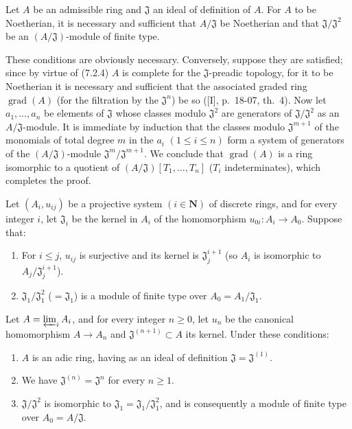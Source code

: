 \begin{corollary}[7.2.6]
\label{0.7.2.6}
Let $A$ be an admissible ring and $\mathfrak J$ an ideal of definition of $A$.
For $A$ to be Noetherian, it is necessary and sufficient that $A/\mathfrak J$ be
Noetherian and that $\mathfrak J/\mathfrak J^2$ be an
$(A/\mathfrak J)$-module of finite type.
\end{corollary}

These conditions are obviously necessary. Conversely, suppose they are
satisfied; since by virtue of (7.2.4) $A$ is complete for the
$\mathfrak J$-preadic topology, for it to be Noetherian it is necessary and sufficient that
the associated graded ring $\operatorname{grad}(A)$ (for the filtration by the
$\mathfrak J^n$) be so ([I], p.~18-07, th.~4). Now let
$a_1,\ldots,a_n$ be elements of $\mathfrak J$ whose classes modulo
$\mathfrak J^2$ are generators of $\mathfrak J/\mathfrak J^2$ as an
$A/\mathfrak J$-module. It is immediate by induction that the classes modulo
$\mathfrak J^{m+1}$ of the monomials of total degree $m$ in the $a_i$
$(1\leq i\leq n)$ form a system of generators of the
$(A/\mathfrak J)$-module $\mathfrak J^m/\mathfrak J^{m+1}$. We conclude that
$\operatorname{grad}(A)$ is a ring isomorphic to a quotient of
$(A/\mathfrak J)[T_1,\ldots,T_n]$ ($T_i$ indeterminates), which completes the
proof.

\begin{proposition}[7.2.7]
\label{0.7.2.7}
Let $(A_i,u_{ij})$ be a projective system $(i\in\mathbf N)$ of discrete rings,
and for every integer $i$, let $\mathfrak J_i$ be the kernel in $A_i$ of
the homomorphism $u_{0i}:A_i\to A_0$. Suppose that:
\begin{enumerate}
  \item[$a)$] For $i\leq j$, $u_{ij}$ is surjective and its kernel is
    $\mathfrak J_j^{i+1}$ (so $A_i$ is isomorphic to
    $A_j/\mathfrak J_j^{i+1}$).
  \item[$b)$] $\mathfrak J_1/\mathfrak J_1^2$ ($=\mathfrak J_1$) is a
    module of finite type over $A_0=A_1/\mathfrak J_1$.
\end{enumerate}
Let $A=\varprojlim_i A_i$, and for every integer $n\geq0$, let $u_n$ be
the canonical homomorphism $A\to A_n$ and $\mathfrak J^{(n+1)}\subset A$ its
kernel. Under these conditions:
\begin{enumerate}
  \item[(i)] $A$ is an adic ring, having as an ideal of definition
    $\mathfrak J=\mathfrak J^{(1)}$.
  \item[(ii)] We have $\mathfrak J^{(n)}=\mathfrak J^n$ for every $n\geq1$.
  \item[(iii)] $\mathfrak J/\mathfrak J^2$ is isomorphic to
    $\mathfrak J_1=\mathfrak J_1/\mathfrak J_1^2$, and is consequently a module
    of finite type over $A_0=A/\mathfrak J$.
\end{enumerate}
\end{proposition}

